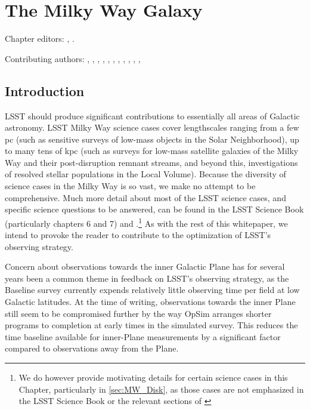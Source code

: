 
\chapter[The Milky Way Galaxy]{The Milky Way Galaxy}
\def\chpname{galaxy}\label{chp:\chpname}

Chapter editors:
,
.

Contributing authors:
,
,
,
,
,
,
,
,
,
,
,



\section{Introduction}
\def\secname{MW_Intro}\label{sec:\secname}

LSST should produce significant contributions to essentially all areas
of Galactic astronomy. LSST Milky Way science cases cover lengthscales
ranging from a few pc (such as sensitive surveys of low-mass objects in
the Solar Neighborhood), up to many tens of kpc (such as surveys for
low-mass satellite galaxies of the Milky Way and their post-disruption
remnant streams, and beyond this, investigations of resolved stellar
populations in the Local Volume). Because the diversity of science cases
in the Milky Way is so vast, we make no attempt to be comprehensive.
Much more detail about most of the LSST science cases, and specific
science questions to be answered, can be found in the LSST Science Book
(particularly chapters 6 and 7) and \citet[][in particular Sections
2.1.4 and 4.4]{IvezicEtal2008}.\footnote{We do however provide
motivating details for certain science cases in this Chapter,
particularly in \autoref{sec:MW_Disk}, as those cases are not
emphasized in the LSST Science Book or the relevant sections of
\citet{IvezicEtal2008}} As with the rest of this whitepaper, we intend
to provoke the reader to contribute to the optimization of LSST's
observing strategy.

Concern about observations towards the inner Galactic Plane has for
several years been a common theme in feedback on LSST's observing
strategy, as the Baseline survey currently expends relatively little
observing time per field at low Galactic latitudes. At the time of
writing, observations towards the inner Plane still seem to be
compromised further by the way OpSim arranges shorter programs to
completion at early times in the simulated survey. This reduces the time
baseline available for inner-Plane measurements by a significant factor
compared to observations away from the Plane.


